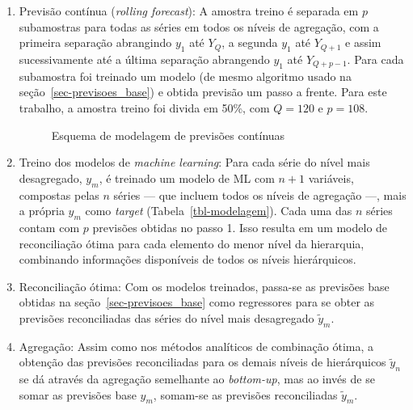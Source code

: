 \documentclass[
  12pt,
  twoside,
  openright,
  a4paper,
  chapter=TITLE,
  section=TITLE,
  brazil]{abntex2}
\begin{document}
\begin{enumerate}
\def\labelenumi{\arabic{enumi}.}
\item
  Previsão contínua (\emph{rolling forecast}): A amostra treino é
  separada em \(p\) subamostras para todas as séries em todos os níveis
  de agregação, com a primeira separação abrangindo \(y_1\) até \(Y_Q\),
  a segunda \(y_1\) até \(Y_{Q+1}\) e assim sucessivamente até a última
  separação abrangendo \(y_1\) até \(Y_{Q+p-1}\). Para cada subamostra
  foi treinado um modelo (de mesmo algoritmo usado na
  seção~\ref{sec-previsoes_base}) e obtida previsão um passo a frente.
  Para este trabalho, a amostra treino foi divida em 50\%, com \(Q=120\)
  e \(p=108\).

  \begin{figure}


  \caption{\label{fig-modelagem-2}Esquema de modelagem de previsões
  contínuas}

  \end{figure}%
\item
  Treino dos modelos de \emph{machine learning}: Para cada série do
  nível mais desagregado, \(y_m\), é treinado um modelo de ML com
  \(n+1\) variáveis, compostas pelas \(n\) séries --- que incluem todos
  os níveis de agregação ---, mais a própria \(y_m\) como \emph{target}
  (Tabela~\ref{tbl-modelagem}). Cada uma das \(n\) séries contam com
  \(p\) previsões obtidas no passo 1. Isso resulta em um modelo de
  reconciliação ótima para cada elemento do menor nível da hierarquia,
  combinando informações disponíveis de todos os níveis hierárquicos.
\item
  Reconciliação ótima: Com os modelos treinados, passa-se as previsões
  base obtidas na seção~\ref{sec-previsoes_base} como regressores para
  se obter as previsões reconciliadas das séries do nível mais
  desagregado \(\tilde{y}_m\).
\item
  Agregação: Assim como nos métodos analíticos de combinação ótima, a
  obtenção das previsões reconciliadas para os demais níveis de
  hierárquicos \(\tilde{y}_n\) se dá através da agregação semelhante ao
  \emph{bottom-up}, mas ao invés de se somar as previsões base
  \(\hat{y}_m\), somam-se as previsões reconciliadas \(\tilde{y}_m\).
\end{enumerate}
\end{document}
